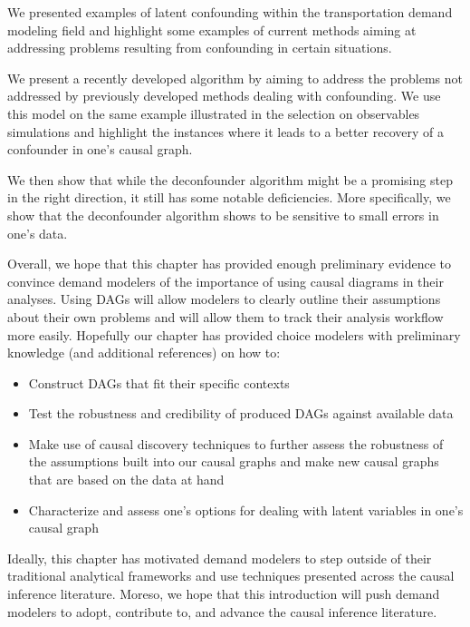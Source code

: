 We presented examples of latent confounding within the transportation demand modeling field and highlight 
some examples of current methods aiming at addressing problems resulting from confounding in certain situations.

We present a recently developed algorithm by \citet{wang_2019_blessings} aiming to address the problems not 
addressed by previously developed methods dealing with confounding. We use this model on the same example illustrated in
the selection on observables simulations and highlight the instances where it leads to a better recovery of 
a confounder in one's causal graph. 

We then show that while the deconfounder algorithm might be a promising step in the right direction, 
it still has some notable deficiencies. More specifically, we show that the deconfounder algorithm shows 
to be sensitive to small errors in one's data.

Overall, we hope that this chapter has provided enough preliminary evidence to convince demand modelers of the importance of using causal diagrams in their analyses.
Using DAGs will allow modelers to clearly outline their assumptions about their own problems and will allow them to track their analysis workflow more easily.
Hopefully our chapter has provided choice modelers with preliminary knowledge (and additional references) on how to:
\begin{itemize}
    \item Construct DAGs that fit their specific contexts
    \item Test the robustness and credibility of produced DAGs against available data
    \item Make use of causal discovery techniques to further assess the robustness of the assumptions built into our causal graphs and make new causal graphs that are based on the data at hand
    \item Characterize and assess one's options for dealing with latent variables in one's causal graph
\end{itemize}

Ideally, this chapter has motivated demand modelers to step outside of their traditional analytical frameworks and use techniques presented across the causal inference literature.
Moreso, we hope that this introduction will push demand modelers to adopt, contribute to, and advance the causal inference literature.
